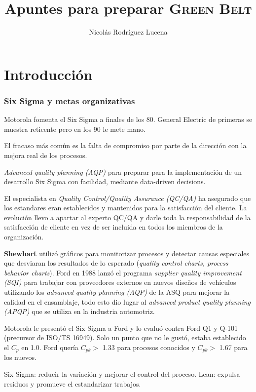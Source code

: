 \documentclass[]{article}
\title{Apuntes para preparar \textsc{Green Belt}}
\author{Nicolás Rodríguez Lucena}
\begin{document}
\maketitle

\part{Introducción}
\section{Six Sigma y metas organizativas}
Motorola fomenta el Six Sigma a finales de los 80. General Electric de primeras se muestra reticente pero en los 90 le mete mano. 

El fracaso más común es la falta de compromiso por parte de la dirección con la mejora real de los procesos.

\textit{Advanced quality planning (AQP)} para preparar para la implementación de un desarrollo Six Sigma con facilidad, mediante data-driven decisions. 

El especialista en \textit{Quality Control/Quality Assurance (QC/QA)} ha asegurado que los estandares eran establecidos y mantenidos para la satisfacción del cliente. La evolución llevo a apartar al experto QC/QA y darle toda la responsabilidad de la satisfacción de cliente en vez de ser incluida en todos los miembros de la organización. 

\textbf{Shewhart} utilizó gráficos para monitorizar procesos y detectar causas especiales que desviaran los resultados de lo esperado (\textit{quality control charts, process behavior charts}). \newline
Ford en 1988 lanzó el programa \textit{supplier quality improvement (SQI)} para trabajar con proveedores externos en nuevos diseños de vehículos utilizando los \textit{advanced quality planning (AQP)} de la ASQ para mejorar la calidad en el ensamblaje, todo esto dio lugar al \textit{advanced product quality planning (APQP)} que se utiliza en la industria automotriz. 

Motorola le presentó el Six Sigma a Ford y lo evaluó contra Ford Q1 y Q-101 (precursor de ISO/TS 16949). Solo un punto que no le gustó, estaba establecido el $C_p$ en 1.0. Ford quería $C_{pk} >$ 1.33 para procesos conocidos y $C_{pk} >$ 1.67 para los nuevos.

Six Sigma: reducir la variación y mejorar el control del proceso. Lean: expulsa residuos y promueve el estandarizar trabajos. 
\end{document}
